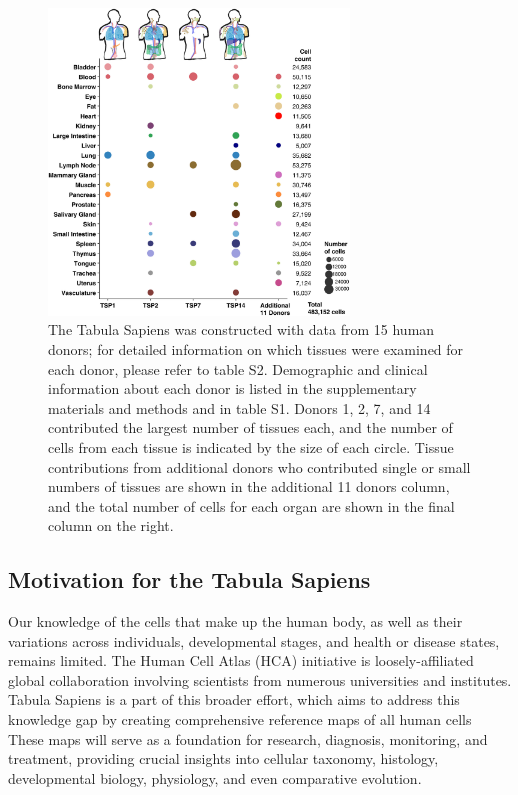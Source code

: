 \begin{figure}[hbt!]
\centering
\includegraphics[width=8cm, keepaspectratio]{figs/TabulaSapiens/fig0_Tabula_Summary.jpg}
\caption[ Overview of Tabula Sapiens.]{The Tabula Sapiens was constructed with data from 15 human donors; for detailed information on which tissues were examined for each donor, please refer to table S2. Demographic and clinical information about each donor is listed in the supplementary materials and methods and in table S1. Donors 1, 2, 7, and 14 contributed the largest number of tissues each, and the number of cells from each tissue is indicated by the size of each circle. Tissue contributions from additional donors who contributed single or small numbers of tissues are shown in the additional 11 donors column, and the total number of cells for each organ are shown in the final column on the right.}
\label{fig:TabulaSapiens_summary}
\end{figure}

\subsection{Motivation for the Tabula Sapiens}

Our knowledge of the cells that make up the human body, as well as their variations across individuals, developmental stages, and health or disease states, remains limited. The Human Cell Atlas (HCA) initiative is loosely-affiliated global collaboration involving scientists from numerous universities and institutes. Tabula Sapiens is a part of this broader effort, which aims to address this knowledge gap by creating comprehensive reference maps of all human cells\cite{regev2017human} These maps will serve as a foundation for research, diagnosis, monitoring, and treatment, providing crucial insights into cellular taxonomy, histology, developmental biology, physiology, and even comparative evolution.

